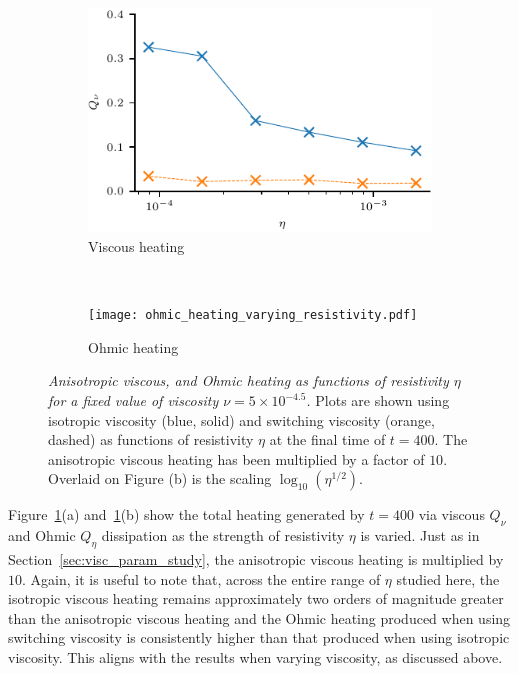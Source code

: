 \begin{figure}[t]
    \centering
    \begin{subfigure}[t]{0.5\textwidth}
      \includegraphics[width=\textwidth]{visc_heating_varying_resistivity.pdf}
      \caption{Viscous heating}
    \end{subfigure}%
    ~
    \begin{subfigure}[t]{0.5\textwidth}
      \texttt{[image: ohmic\_heating\_varying\_resistivity.pdf]}
      \caption{Ohmic heating}
    \end{subfigure}
    \caption{\textit{Anisotropic viscous, and Ohmic heating as functions of resistivity $\eta$ for a fixed value of viscosity $\nu=5\times10^{-4.5}$.} Plots are shown using isotropic viscosity (blue, solid) and switching viscosity (orange, dashed) as functions of resistivity $\eta$ at the final time of $t=400$. The anisotropic viscous heating has been multiplied by a factor of $10$. Overlaid on Figure (b) is the scaling $\log_{10}(\eta^{1/2})$.}
    \label{fig:param_study_varying_resistivity}
\end{figure}

Figure~\ref{fig:param_study_varying_resistivity}(a) and~\ref{fig:param_study_varying_resistivity}(b) show the total heating generated by $t=400$ via viscous $Q_{\nu}$ and Ohmic $Q_{\eta}$ dissipation as the strength of resistivity $\eta$ is varied. Just as in Section~\ref{sec:visc_param_study}, the anisotropic viscous heating is multiplied by $10$. Again, it is useful to note that, across the entire range of $\eta$ studied here, the isotropic viscous heating remains approximately two orders of magnitude greater than the anisotropic viscous heating and the Ohmic heating produced when using switching viscosity is consistently higher than that produced when using isotropic viscosity. This aligns with the results when varying viscosity, as discussed above.

